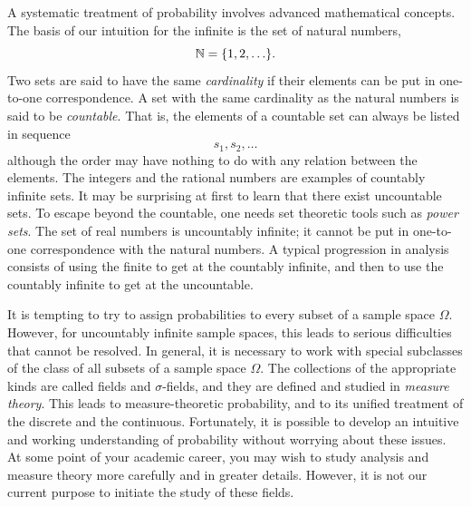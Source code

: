 A systematic treatment of probability involves advanced mathematical concepts.
The basis of our intuition for the infinite is the set of natural numbers,
\begin{equation*}
\mathbb{N} = \{ 1, 2, \ldots \}.
\end{equation*}
Two sets are said to have the same \emph{cardinality} if their elements can be put in one-to-one correspondence. 
A set with the same cardinality as the natural numbers is said to be \emph{countable}. 
That is, the elements of a countable set can always be listed in sequence
\begin{equation*}
s_1, s_2, \ldots
\end{equation*}
although the order may have nothing to do with any relation between the elements.
The integers and the rational numbers are examples of countably infinite sets.
It may be surprising at first to learn that there exist uncountable sets.
To escape beyond the countable, one needs set theoretic tools such as \emph{power sets}.
The set of real numbers is uncountably infinite; it cannot be put in one-to-one correspondence with the natural numbers.
A typical progression in analysis consists of using the finite to get at the countably infinite, and then to use the countably infinite to get at the uncountable.

It is tempting to try to assign probabilities to every subset of a sample space $\Omega$.
However, for uncountably infinite sample spaces, this leads to serious difficulties that cannot be resolved.
In general, it is necessary to work with special subclasses of the class of all subsets of a sample space $\Omega$.
The collections of the appropriate kinds are called fields and $\sigma$-fields, and they are defined and studied in \emph{measure theory}. 
This leads to measure-theoretic probability, and to its unified treatment of the discrete and the continuous.
Fortunately, it is possible to develop an intuitive and working understanding of probability without worrying about these issues.
At some point of your academic career, you may wish to study analysis and measure theory more carefully and in greater details.
However, it is not our current purpose to initiate the study of these fields.

